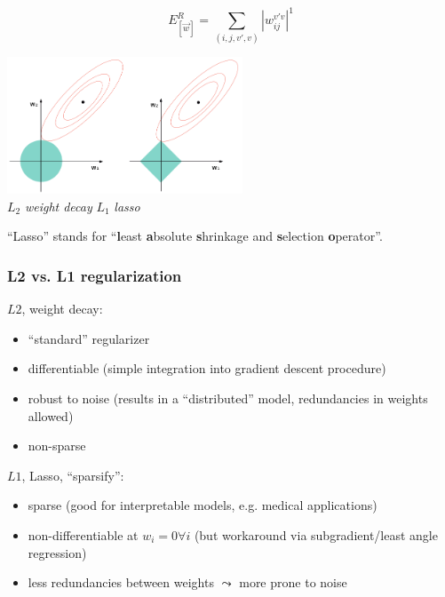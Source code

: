 \begin{frame}\frametitle{\subsecname}

	\begin{equation}
		E^R_{[\vec w]} = \sum\limits_{(i, j, v', v)} {|w_{ij}^{v'v}|}^1
	\end{equation}
	
	\begin{center}
		\includegraphics[width=7cm]{img/RegularizationTypesIntersect_clean.png} \\[-2mm]
		{ \footnotesize $L_2$ {\em weight decay}
			\hspace{1cm} $L_1$ {\em lasso}\hspace{1cm} $ $}
	\end{center}
	
	``Lasso'' stands for ``\textbf{l}east \textbf{a}bsolute \textbf{s}hrinkage and \textbf{s}election \textbf{o}perator''.


\end{frame}

\begin{frame}\frametitle{L2 vs. L1 regularization}


\svspace{5mm}

$L2$, weight decay:
\begin{itemize}
\item ``standard'' regularizer
\item differentiable (simple integration into gradient descent procedure)
\item robust to noise (results in a ``distributed'' model, redundancies in weights allowed)
\item non-sparse
\end{itemize}

\pause

$L1$, Lasso, ``sparsify'':

\begin{itemize}
\item sparse (good for interpretable models, e.g. medical applications)
\item non-differentiable at $w_i = 0 \forall i$ (but workaround via subgradient/least angle regression)
\item less redundancies between weights $\leadsto$ more prone to noise
\end{itemize}


\end{frame}

